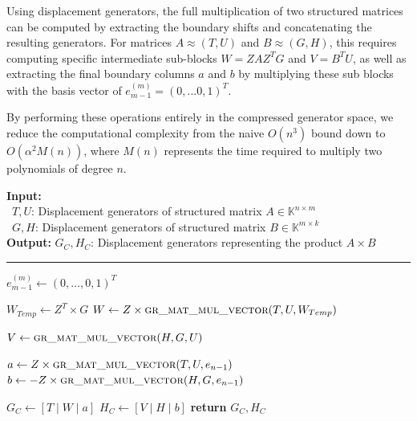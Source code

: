 Using displacement generators, the full multiplication of two
structured matrices can be computed by extracting the
boundary shifts and concatenating the resulting generators.
For matrices $A \approx (T,U)$ and $B \approx (G,H)$, this requires computing
specific intermediate sub-blocks $W = Z A Z^T G$ and $V = B^T U$, as
well as extracting
the final boundary columns $a$ and $b$ by multiplying these sub
blocks with the basis vector of $e^{(m)}_{m-1} = (0, ... 0, 1)^T $.

By performing these operations entirely in the compressed generator
space, we reduce the computational complexity from the naive
$O(n^3)$ bound down to $O(\alpha^2 M(n))$, where $M(n)$ represents the
time required to multiply two polynomials of degree $n$.

\begin{algorithm}[H]
  \caption{Generator Multiplication}

  \textbf{Input:} \\
  \hspace*{0.5cm} \textbullet \ $T, U$: Displacement generators of
  structured matrix $A \in \mathbb{K}^{n \times m}$ \\
  \hspace*{0.5cm} \textbullet \ $G, H$: Displacement generators of
  structured matrix $B \in \mathbb{K}^{m \times k}$ \\
  \textbf{Output:} $G_C, H_C$: Displacement generators representing
  the product $A \times B$

  \vspace{0.15cm}
  \hrule
  \vspace{0.15cm}

  \begin{algorithmic}[1]
    \State $e^{(m)}_{m-1} \gets (0, \dots, 0, 1)^T$ 
    \vspace{0.1cm}

    \State $W_{Temp} \gets Z^T \times G$
    \State $W \gets Z \times \Call{gr\_mat\_mul\_vector}{T, U, W_{Temp}}$
    \vspace{0.1cm}

    \State $V \gets \Call{gr\_mat\_mul\_vector}{H, G, U}$
    \vspace{0.1cm}

    \State $a \gets Z \times \Call{gr\_mat\_mul\_vector}{T, U, e_{n-1}}$
    \State $b \gets -Z \times \Call{gr\_mat\_mul\_vector}{H, G, e_{n-1}}$
    \vspace{0.1cm}

    \State $G_C \gets [T \mid W \mid a]$ 
    \State $H_C \gets [V \mid H \mid b]$ 
    \State \textbf{return} $G_C, H_C$
    \EndFunction
  \end{algorithmic}
\end{algorithm}

